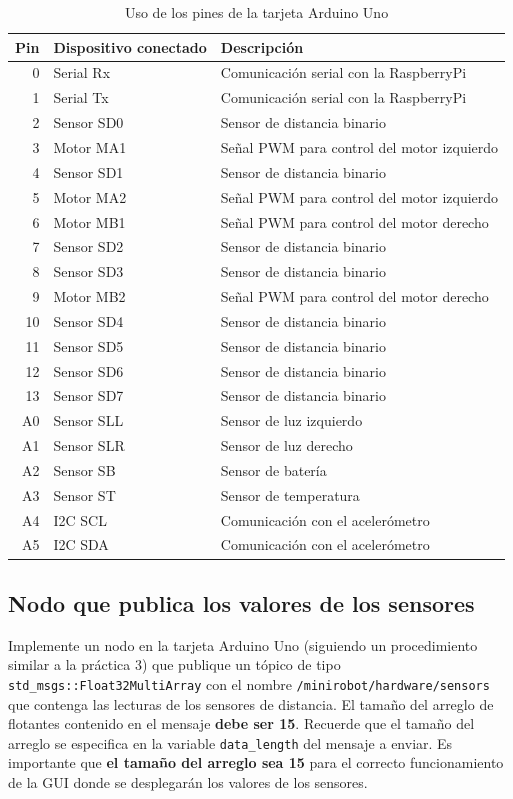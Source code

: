 \documentclass[a4paper,12pt]{article}
\begin{document}
\begin{table}
\centering
\begin{tabular}{rll}
\hline
Pin & Dispositivo conectado & Descripción\\
\hline
0 & Serial Rx  & Comunicación serial con la RaspberryPi\\
1 & Serial Tx  & Comunicación serial con la RaspberryPi\\
2 & Sensor SD0 & Sensor de distancia binario\\
3 & Motor MA1  & Señal PWM para control del motor izquierdo\\
4 & Sensor SD1 & Sensor de distancia binario\\
5 & Motor MA2  & Señal PWM para control del motor izquierdo\\
6 & Motor MB1  & Señal PWM para control del motor derecho\\
7 & Sensor SD2 & Sensor de distancia binario\\
8 & Sensor SD3 & Sensor de distancia binario\\
9 & Motor MB2  & Señal PWM para control del motor derecho\\
10& Sensor SD4 & Sensor de distancia binario\\
11& Sensor SD5 & Sensor de distancia binario\\
12& Sensor SD6 & Sensor de distancia binario\\
13& Sensor SD7 & Sensor de distancia binario\\
A0& Sensor SLL & Sensor de luz izquierdo\\
A1& Sensor SLR & Sensor de luz derecho\\
A2& Sensor SB  & Sensor de batería\\
A3& Sensor ST  & Sensor de temperatura\\
A4& I2C SCL    & Comunicación con el acelerómetro\\
A5& I2C SDA    & Comunicación con el acelerómetro\\
\hline
\end{tabular}
\caption{Uso de los pines de la tarjeta Arduino Uno}
\label{tab:PinUsage}
\end{table}

\subsection{Nodo que publica los valores de los sensores}
Implemente un nodo en la tarjeta Arduino Uno (siguiendo un procedimiento similar a la práctica 3) que publique un tópico de tipo \texttt{std\_msgs::Float32MultiArray} con el nombre \texttt{/minirobot/hardware/sensors} que contenga las lecturas de los sensores de distancia. El tamaño del arreglo de flotantes contenido en el mensaje \textbf{debe ser 15}. Recuerde que el tamaño del arreglo se especifica en la variable \texttt{data\_length} del mensaje a enviar. Es importante que \textbf{el tamaño del arreglo sea 15} para el correcto funcionamiento de la GUI donde se desplegarán los valores de los sensores. 
\end{document}
